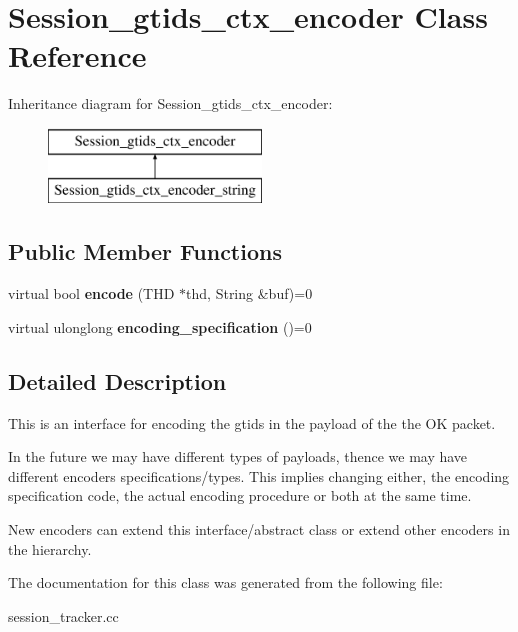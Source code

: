 \hypertarget{classSession__gtids__ctx__encoder}{}\section{Session\+\_\+gtids\+\_\+ctx\+\_\+encoder Class Reference}
\label{classSession__gtids__ctx__encoder}
Inheritance diagram for Session\+\_\+gtids\+\_\+ctx\+\_\+encoder\+:\begin{figure}[H]
\begin{center}
\leavevmode
\includegraphics[height=2.000000cm]{classSession__gtids__ctx__encoder}
\end{center}
\end{figure}
\subsection*{Public Member Functions}
\begin{DoxyCompactItemize}
\item 
\mbox{\label{classSession__gtids__ctx__encoder_a7ca94e87acaf235565a106f04a6f7f5e}} 
virtual bool {\bfseries encode} (T\+HD $\ast$thd, String \&buf)=0
\item 
\mbox{\label{classSession__gtids__ctx__encoder_a6f7f77281c6582b3448a05aaf62cda54}} 
virtual ulonglong {\bfseries encoding\+\_\+specification} ()=0
\end{DoxyCompactItemize}


\subsection{Detailed Description}
This is an interface for encoding the gtids in the payload of the the OK packet.

In the future we may have different types of payloads, thence we may have different encoders specifications/types. This implies changing either, the encoding specification code, the actual encoding procedure or both at the same time.

New encoders can extend this interface/abstract class or extend other encoders in the hierarchy. 

The documentation for this class was generated from the following file\+:\begin{DoxyCompactItemize}
\item 
session\+\_\+tracker.\+cc\end{DoxyCompactItemize}

